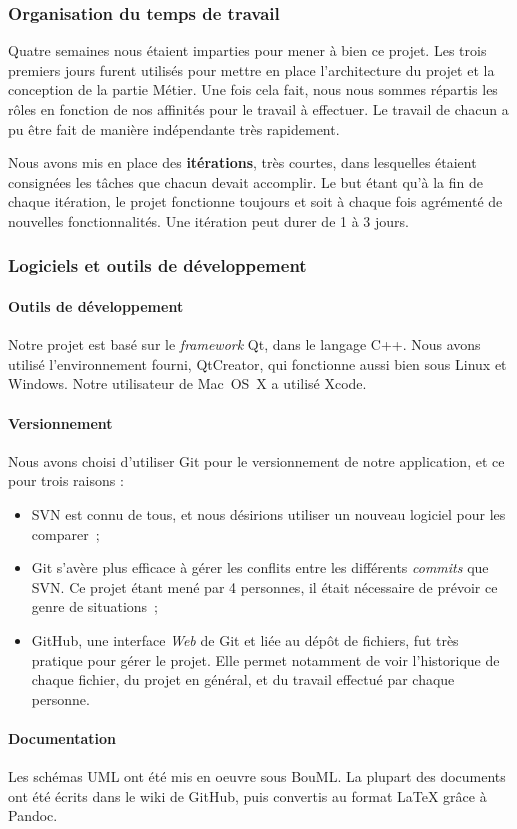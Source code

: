 \subsubsection{Organisation du temps de travail}

Quatre semaines nous étaient imparties pour mener à bien ce projet.
Les trois premiers jours furent utilisés pour mettre en place
l'architecture du projet et la conception de la partie Métier. Une
fois cela fait, nous nous sommes répartis les rôles en fonction de
nos affinités pour le travail à effectuer. Le travail de chacun a
pu être fait de manière indépendante très rapidement.

Nous avons mis en place des \textbf{itérations}, très courtes, dans
lesquelles étaient consignées les tâches que chacun devait
accomplir. Le but étant qu'à la fin de chaque itération, le projet
fonctionne toujours et soit à chaque fois agrémenté de nouvelles
fonctionnalités. Une itération peut durer de 1 à 3 jours.

\subsubsection{Logiciels et outils de développement}

\paragraph{Outils de développement}

Notre projet est basé sur le \emph{framework} Qt, dans le langage
C++. Nous avons utilisé l'environnement fourni, QtCreator, qui
fonctionne aussi bien sous Linux et Windows. Notre utilisateur de
Mac~OS~X a utilisé Xcode.

\paragraph{Versionnement}

Nous avons choisi d'utiliser Git pour le versionnement de notre
application, et ce pour trois raisons :

\begin{itemize}
\item
  SVN est connu de tous, et nous désirions utiliser un nouveau
  logiciel pour les comparer~;
\item
  Git s'avère plus efficace à gérer les conflits entre les différents
  \emph{commits} que SVN. Ce projet étant mené par 4 personnes, il
  était nécessaire de prévoir ce genre de situations~;
\item
  GitHub, une interface \emph{Web} de Git et liée au dépôt de
  fichiers, fut très pratique pour gérer le projet. Elle permet
  notamment de voir l'historique de chaque fichier, du projet en
  général, et du travail effectué par chaque personne.
\end{itemize}

\paragraph{Documentation}

Les schémas UML ont été mis en oeuvre sous BouML. La plupart des
documents ont été écrits dans le wiki de GitHub, puis convertis au
format LaTeX grâce à Pandoc.

